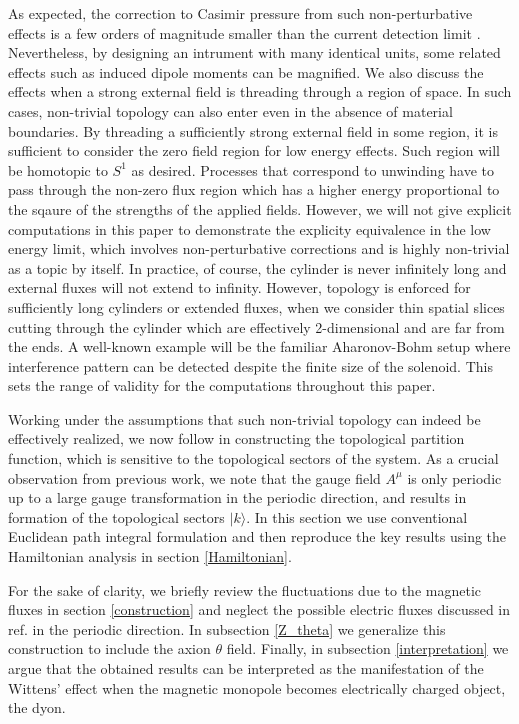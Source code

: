 \documentclass[ twocolumn,aps,prd,   
               preprintnumbers,numbers,sort&compress,nofootinbib,
                            showpacs,superscriptaddress,
               colorlinks,
               linkcolor=blue,   
               citecolor=blue]{revtex4-1}   \newcommand{\exclude}[1]{}
\def\ra{\rangle}
\begin{document}
As expected, the correction to Casimir pressure from such non-perturbative effects  is a few orders of magnitude smaller than the current detection limit \cite{Cao:2013na}. Nevertheless, by designing an intrument with many identical units, some related effects such as induced dipole moments can be magnified. We also discuss the effects when a strong external field is threading through a region of space. In such cases, non-trivial topology can also enter even in the absence of material boundaries. By threading a sufficiently strong external field in some region, it is sufficient to consider the zero field region for low energy effects. Such region will be homotopic to $S^1$ as desired. Processes that correspond to unwinding have to pass through the non-zero flux region which has a higher energy proportional to the sqaure of the strengths of the applied fields. However, we will not give explicit computations in this paper to demonstrate the explicity equivalence in the low energy limit, which involves non-perturbative corrections and is highly non-trivial as a topic by itself. In practice, of course, the cylinder is never infinitely long and external fluxes will not extend to infinity. However, topology is enforced for sufficiently long cylinders or extended fluxes, when we consider thin spatial slices cutting through the cylinder which are effectively 2-dimensional and are far from the ends. A well-known example will be the familiar Aharonov-Bohm setup where interference pattern can be detected despite the finite size of the solenoid. This sets the range of validity for the computations throughout this paper.

Working under the assumptions that such non-trivial topology can indeed be effectively realized, we now follow \cite{Cao:2013na,Cao:2015uza} in constructing the topological partition function, which is sensitive to the topological sectors of the system.  As a crucial observation from previous work, we note that the gauge field $A^{\mu}$ is only periodic up to a large gauge transformation in the periodic direction, and results in formation of the topological sectors $|k\ra$. In this section we use conventional Euclidean path integral formulation and then reproduce the key results using the Hamiltonian analysis in section \ref{Hamiltonian}. 

For the sake of clarity, we briefly review the fluctuations  due to the magnetic fluxes \cite{Cao:2013na} in section \ref{construction} and neglect the possible electric fluxes discussed in ref. \cite{Cao:2015uza} in the periodic direction. 
In subsection \ref{Z_theta} we generalize this construction to include the axion $\theta$ field.
Finally, in subsection \ref{interpretation} we argue that the obtained results can be interpreted as the manifestation of the Wittens' effect  \cite{Witten:1979ey} when the magnetic monopole becomes electrically  charged object, the dyon. 
\end{document}
